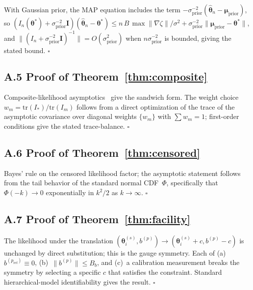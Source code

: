 \documentclass[12pt]{article}
\theoremstyle{plain}
\theoremstyle{definition}
\theoremstyle{remark}
\newcommand{\norm}[1]{\lVert #1 \rVert}
\begin{document}
With Gaussian prior, the MAP equation includes the term
$-\sigma_{\mathrm{prior}}^{-2}(\hat{\boldsymbol\theta}_n -
\boldsymbol\mu_{\mathrm{prior}})$, so
$(I_n(\boldsymbol\theta^*) + \sigma_{\mathrm{prior}}^{-2}\mathbf{I})(\hat{\boldsymbol\theta}_n -
\boldsymbol\theta^*) \le n\,B\,\max\norm{\nabla\zeta}/\sigma^2 +
\sigma_{\mathrm{prior}}^{-2}\norm{\boldsymbol\mu_{\mathrm{prior}} -
\boldsymbol\theta^*}$, and
$\norm{(I_n + \sigma_{\mathrm{prior}}^{-2}\mathbf{I})^{-1}} = O(\sigma_{\mathrm{prior}}^2)$
when $n\sigma_{\mathrm{prior}}^{-2}$ is bounded, giving the stated bound.
\hfill$\square$

\subsection*{A.5 Proof of Theorem~\ref{thm:composite}}

Composite-likelihood asymptotics~\citep[Theorem 4]{Varin2011} give the
sandwich form.  The weight choice $w_m = \mathrm{tr}(I_*)/\mathrm{tr}(I_m)$
follows from a direct optimization of the trace of the asymptotic
covariance over diagonal weights $\{w_m\}$ with $\sum w_m = 1$; first-order
conditions give the stated trace-balance.
\hfill$\square$

\subsection*{A.6 Proof of Theorem~\ref{thm:censored}}

Bayes' rule on the censored likelihood factor; the asymptotic statement
follows from the tail behavior of the standard normal CDF~$\Phi$,
specifically that $\Phi(-k) \to 0$ exponentially in $k^2/2$ as $k\to\infty$.
\hfill$\square$

\subsection*{A.7 Proof of Theorem~\ref{thm:facility}}

The likelihood under the translation $(\boldsymbol\theta_i^{(s)}, b^{(p)})
\to (\boldsymbol\theta_i^{(s)} + c, b^{(p)} - c)$ is unchanged by direct
substitution; this is the gauge symmetry.  Each of (a)~$b^{(p_{\mathrm{ref}})}
\equiv 0$, (b)~$\norm{b^{(p)}}\le B_b$, and (c)~a calibration measurement
breaks the symmetry by selecting a specific $c$ that satisfies the
constraint.  Standard hierarchical-model identifiability \citep[Ch.~6]{vdVaart1998}
gives the result.
\hfill$\square$

\end{document}
